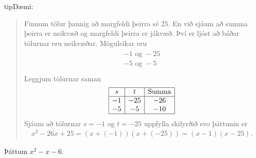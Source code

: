 \documentclass[a4paper,10pt,icelandic]{sphinxmanual}
\begin{document}
\begin{sphinxadmonition}{tip}{Dæmi:}
\begin{quote}
Finnum tölur þannig að margfeldi þeirra sé \(25\). En við sjáum að summa þeirra er neikvæð og margfeldi þeirra er jákvæð. Því er ljóst að báðar tölurnar eru neikvæðar. Möguleikar eru
\begin{equation*}
\begin{split}\begin{array}{c}
-1 \text{ og } -25 \\
-5 \text{ og } -5 \\
\end{array}\end{split}
\end{equation*}
Leggjum tölurnar saman
\begin{equation*}
\begin{split}\begin{array}{ | c | c | c | }
\hline
s & t & \text{Summa} \\
\hline
-1 & -25 & -26\\
-5 & -5 & -10\\
\hline
\end{array}\end{split}
\end{equation*}
Sjáum að tölurnar \(s = -1\) og \(t= -25\) uppfylla skilyrðið svo þáttunin er
\begin{equation*}
\begin{split}x^2-26x+25=(x+(-1))(x+(-25))=(x-1)(x-25).\end{split}
\end{equation*}\end{quote}

 Þáttum \(x^2-x-6\).
\begin{quote}


\end{quote}
\end{sphinxadmonition}
\end{document}
